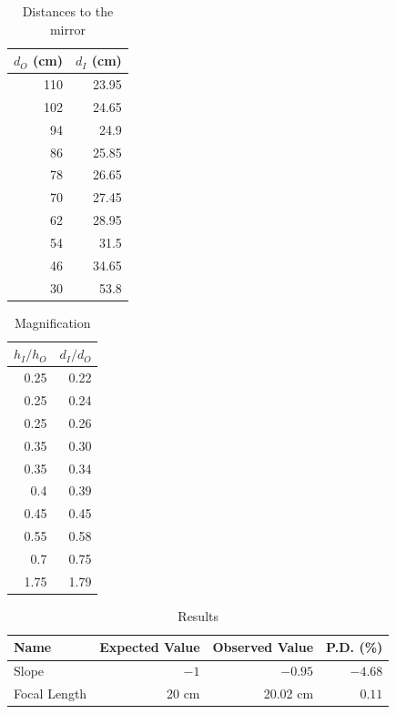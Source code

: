 \begin{table}[ht]
    \centering
    \begin{tabular}{|r|r|}
        \hline
        $d_{O}$ (cm) & $d_{I}$ (cm) \\
        \hline
        110 & 23.95 \\
        102 & 24.65 \\
        94 & 24.9 \\
        86 & 25.85 \\
        78 & 26.65 \\
        70 & 27.45 \\
        62 & 28.95 \\
        54 & 31.5 \\
        46 & 34.65 \\
        30 & 53.8 \\
        \hline
    \end{tabular}
    \caption{Distances to the mirror}
    \label{table.07.distance}
\end{table}
\begin{table}[ht]
    \centering
    \begin{tabular}{|r|r|}
        \hline
        $h_{I} / h_{O}$ & $d_{I} / d_{O}$ \\
        \hline
        0.25 & 0.22 \\
        0.25 & 0.24 \\
        0.25 & 0.26 \\
        0.35 & 0.30 \\
        0.35 & 0.34 \\
        0.4 & 0.39 \\
        0.45 & 0.45 \\
        0.55 & 0.58 \\
        0.7 & 0.75 \\
        1.75 & 1.79 \\
        \hline
    \end{tabular}
    \caption{Magnification}
    \label{table.07.magnification}
\end{table}
\begin{table}[ht]
    \centering
    \begin{tabular}{|l|r|r|r|}
        \hline
        Name & Expected Value & Observed Value & P.D. (\%) \\
        \hline
        Slope & $-1$ & $-0.95$ & $-4.68$ \\
        Focal Length & 20 cm & 20.02 cm & $0.11$ \\
        \hline
    \end{tabular}
    \caption{Results}
    \label{table.07.results}
\end{table}
\newpage
\FloatBarrier
